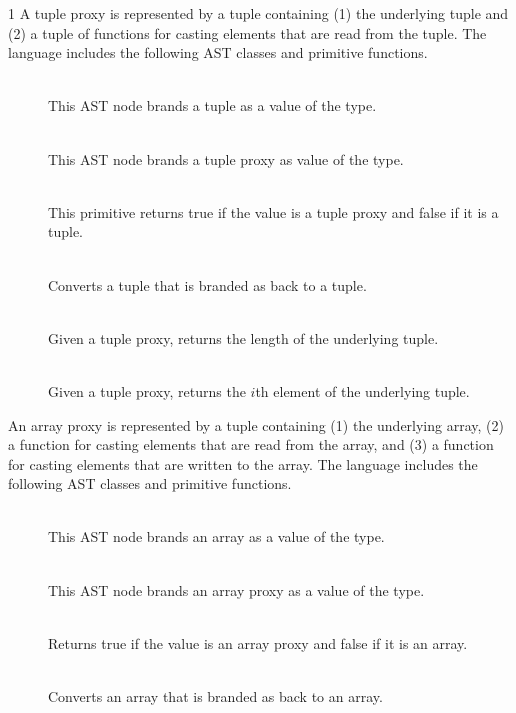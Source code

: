 \documentclass[7x10]{TimesAPriori_MIT}%
\def\pythonEd{1}
\providecommand{\BookEdition}{1}
\let\edition\BookEdition
\newcommand{\pythonColor}[0]{}
\numberwithin{theorem}{chapter}
\numberwithin{definition}{chapter}
\numberwithin{equation}{chapter}
\begin{document}
{\if\edition\pythonEd\pythonColor
%
A tuple proxy is represented by a tuple containing (1) the underlying
tuple and (2) a tuple of functions for casting elements that are read
from the tuple. The \LangPVec{} language includes the following AST
classes and primitive functions.

\begin{description}
\item[] \ \\
%
  This AST node brands a tuple as a value of the \PTUPLETYNAME{} type.
\item[]\ \\
%
  This AST node brands a tuple proxy as value of the \PTUPLETYNAME{} type.
\item[]\ \\
%
  This primitive returns true if the value is a tuple proxy and false
  if it is a tuple.
\item[]\ \\
%
  Converts a tuple that is branded as \PTUPLETYNAME{}
  back to a tuple.
  
\item[]\ \\
%
  Given a tuple proxy, returns the length of the underlying tuple.
  
\item[]\ \\
%
  Given a tuple proxy, returns the $i$th element of the underlying
  tuple.
  
\end{description}

An array proxy is represented by a tuple containing (1) the underlying
array, (2) a function for casting elements that are read from the
array, and (3) a function for casting elements that are written to the
array.  The \LangPVec{} language includes the following AST classes
and primitive functions.

\begin{description}
\item[]\ \\
  This AST node brands an array as a value of the \PARRAYTYNAME{} type.

\item[]\ \\
%
  This AST node brands an array proxy as a value of the \PARRAYTYNAME{} type.
\item[]\ \\
%
  Returns true if the value is an array proxy and false if it is an
  array.
\item[]\ \\
%
  Converts an array that is branded as \PARRAYTYNAME{} back to an
  array.
  

\end{description}}
\end{document}

